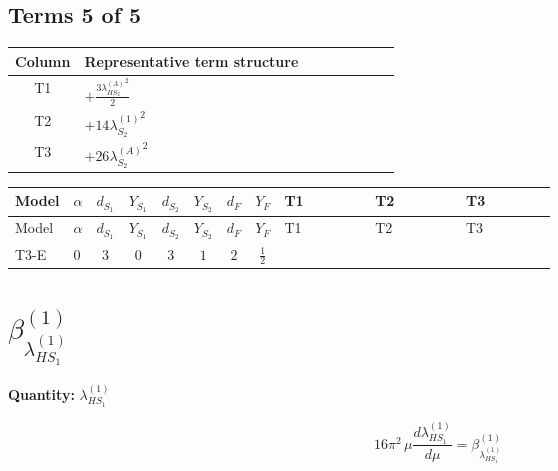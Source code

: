 \documentclass[8pt]{article}
\begin{document}
\begin{landscape}
\subsection*{Terms 5 of 5}
\begin{center}
\begin{tabular}{@{}c >{\raggedright\arraybackslash}p{0.82\linewidth}@{}}
\toprule
Column & Representative term structure \\
\midrule
T1 & \(\displaystyle +\frac{3 {\lambda_{HS_2}^{(A)}}^2}{2}\) \\
\midrule
T2 & \(\displaystyle +14 {\lambda_{S_2}^{(1)}}^2\) \\
\midrule
T3 & \(\displaystyle +26 {\lambda_{S_2}^{(A)}}^2\) \\
\midrule
\bottomrule
\end{tabular}
\end{center}
\smallskip
\tiny
\begin{longtable}{@{}llcccccc >{\raggedright\arraybackslash}p{0.21\linewidth} >{\raggedright\arraybackslash}p{0.21\linewidth} >{\raggedright\arraybackslash}p{0.21\linewidth}@{}}
\toprule
Model & $\alpha$ & $d_{S_1}$ & $Y_{S_1}$ & $d_{S_2}$ & $Y_{S_2}$ & $d_F$ & $Y_F$ & T1 & T2 & T3 \\
\midrule
\endfirsthead
\toprule
Model & $\alpha$ & $d_{S_1}$ & $Y_{S_1}$ & $d_{S_2}$ & $Y_{S_2}$ & $d_F$ & $Y_F$ & T1 & T2 & T3 \\
\midrule
\endhead
T3-E & $0$ & $3$ & $0$ & $3$ & $1$ & $2$ & $\frac{1}{2}$ & \scriptsize\adjustbox{max width=\linewidth}{$\begin{gathered} +\frac{3 {\lambda_{HS_2}^{(A)}}^2}{2}\end{gathered}$} & \scriptsize\adjustbox{max width=\linewidth}{$\begin{gathered} +14 {\lambda_{S_2}^{(1)}}^2\end{gathered}$} & \scriptsize\adjustbox{max width=\linewidth}{$\begin{gathered} +26 {\lambda_{S_2}^{(A)}}^2\end{gathered}$} \\
\midrule
\bottomrule
\end{longtable}
\clearpage
\section*{$\beta_{\lambda_{HS_1}^{(1)}}^{(1)}$}
\noindent\textbf{Quantity: }$\lambda_{HS_1}^{(1)}$\par\smallskip
\[16\pi^2\,\mu\frac{d \lambda_{HS_1}^{(1)}}{d\mu}=\beta_{\lambda_{HS_1}^{(1)}}^{(1)}\]

\end{landscape}
\end{document}

